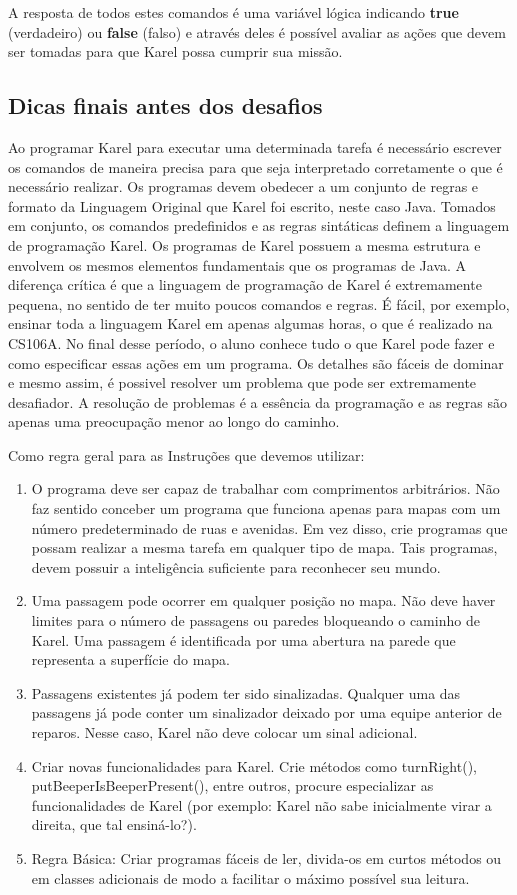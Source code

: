 \documentclass[a4paper,11pt]{article}
\begin{document}
A resposta de todos estes comandos é uma variável lógica indicando \textbf{true} (verdadeiro) ou \textbf{false} (falso) e através deles é possível avaliar as ações que devem ser tomadas para que Karel possa cumprir sua missão.

\subsection{Dicas finais antes dos desafios}
Ao programar Karel para executar uma determinada tarefa é necessário escrever os comandos de maneira precisa para que seja interpretado corretamente o que é necessário realizar. Os programas devem obedecer a um conjunto de regras e formato da Linguagem Original que Karel foi escrito, neste caso Java. Tomados em conjunto, os comandos predefinidos e as regras sintáticas definem a linguagem de programação Karel. Os programas de Karel possuem a mesma estrutura e envolvem os mesmos elementos fundamentais que os programas de Java. A diferença crítica é que a linguagem de programação de Karel é extremamente pequena, no sentido de ter muito poucos comandos e regras. É fácil, por exemplo, ensinar toda a linguagem Karel em apenas algumas horas, o que é realizado na CS106A. No final desse período, o aluno conhece tudo o que Karel pode fazer e como especificar essas ações em um programa. Os detalhes são fáceis de dominar e mesmo assim, é possivel resolver um problema que pode ser extremamente desafiador. A resolução de problemas é a essência da programação e as regras são apenas uma preocupação menor ao longo do caminho.

Como regra geral para as Instruções que devemos utilizar: \vspace{-1em}
\begin{enumerate}
  \item O programa deve ser capaz de trabalhar com comprimentos arbitrários. Não faz sentido conceber um programa que funciona apenas para mapas com um número predeterminado de ruas e avenidas. Em vez disso, crie programas que possam realizar a mesma tarefa em qualquer tipo de mapa. Tais programas, devem possuir a inteligência suficiente para reconhecer seu mundo.
  \item Uma passagem pode ocorrer em qualquer posição no mapa. Não deve haver limites para o número de passagens ou paredes bloqueando o caminho de Karel. Uma passagem é identificada por uma abertura na parede que representa a superfície do mapa.
  \item Passagens existentes já podem ter sido sinalizadas. Qualquer uma das passagens já pode conter um sinalizador deixado por uma equipe anterior de reparos. Nesse caso, Karel não deve colocar um sinal adicional.
  \item Criar novas funcionalidades para Karel. Crie métodos como turnRight(), putBeeperIsBeeperPresent(), entre outros, procure especializar as funcionalidades de Karel (por exemplo: Karel não sabe inicialmente virar a direita, que tal ensiná-lo?). 
  \item Regra Básica: Criar programas fáceis de ler, divida-os em curtos métodos ou em classes adicionais de modo a facilitar o máximo possível sua leitura.
\end{enumerate}
\end{document}
